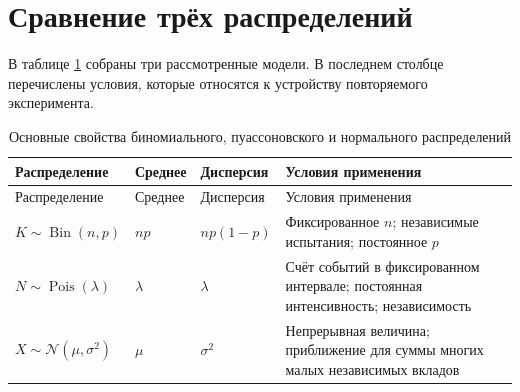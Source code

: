\documentclass[
  russian,
  11pt,
  a4paper,
  open=any]{scrbook}
\begin{document}
\section{Сравнение трёх
распределений}\label{ux441ux440ux430ux432ux43dux435ux43dux438ux435-ux442ux440ux451ux445-ux440ux430ux441ux43fux440ux435ux434ux435ux43bux435ux43dux438ux439}

В таблице \ref{tbl-basic-distributions} собраны три рассмотренные
модели. В последнем столбце перечислены условия, которые относятся к
устройству повторяемого эксперимента.

\begin{longtable}[]{@{}
  >{\raggedright\arraybackslash}p{}
  >{\centering\arraybackslash}p{}
  >{\centering\arraybackslash}p{}
  >{\raggedright\arraybackslash}p{}@{}}
\caption{Основные свойства биномиального, пуассоновского и нормального
распределений}\label{tbl-basic-distributions}\tabularnewline
\toprule\noalign{}
\begin{minipage}[b]{\linewidth}\raggedright
Распределение
\end{minipage} & \begin{minipage}[b]{\linewidth}\centering
Среднее
\end{minipage} & \begin{minipage}[b]{\linewidth}\centering
Дисперсия
\end{minipage} & \begin{minipage}[b]{\linewidth}\raggedright
Условия применения
\end{minipage} \\
\midrule\noalign{}
\endfirsthead
\toprule\noalign{}
\begin{minipage}[b]{\linewidth}\raggedright
Распределение
\end{minipage} & \begin{minipage}[b]{\linewidth}\centering
Среднее
\end{minipage} & \begin{minipage}[b]{\linewidth}\centering
Дисперсия
\end{minipage} & \begin{minipage}[b]{\linewidth}\raggedright
Условия применения
\end{minipage} \\
\midrule\noalign{}
\endhead
\bottomrule\noalign{}
\endlastfoot
\(K\sim\operatorname{Bin}(n,p)\) & \(np\) & \(np(1-p)\) & Фиксированное
\(n\); независимые испытания; постоянное \(p\) \\
\(N\sim\operatorname{Pois}(\lambda)\) & \(\lambda\) & \(\lambda\) & Счёт
событий в фиксированном интервале; постоянная интенсивность;
независимость \\
\(X\sim\mathcal N(\mu,\sigma^2)\) & \(\mu\) & \(\sigma^2\) & Непрерывная
величина; приближение для суммы многих малых независимых вкладов \\
\end{longtable}
\end{document}

